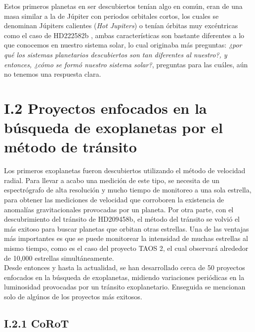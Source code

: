 Estos primeros planetas en ser descubiertos tenían algo en común, eran de una masa similar a la de Júpiter con periodos orbitales cortos, los cuales se denominan Júpiters calientes (\textit{Hot Jupiters}) o tenían órbitas muy excéntricas como el caso de HD222582b \cite{vogt2000six}, ambas características son bastante diferentes a lo que conocemos en nuestro sistema solar, lo cual originaba más preguntas: \textit{¿por qué los sistemas planetarios descubiertos son tan diferentes al nuestro?, y entonces, ¿cómo se formó nuestro sistema solar?}, preguntas para las cuáles, aún no tenemos una respuesta clara.\\ 

\section*{I.2 Proyectos enfocados en la búsqueda de exoplanetas por el método de tránsito}

Los primeros exoplanetas fueron descubiertos utilizando el método de velocidad radial. Para llevar a acabo una medición de este tipo, se necesita de un espectrógrafo de alta resolución y mucho tiempo de monitoreo a una sola estrella, para obtener las mediciones de velocidad que corroboren la existencia de anomalías gravitacionales provocadas por un planeta. Por otra parte, con el descubrimiento del tránsito de HD209458b, el método del tránsito se volvió el más exitoso para buscar planetas que orbitan otras estrellas. Una de las ventajas más importantes es que se puede monitorear la intensidad de muchas estrellas al mismo tiempo, como es el caso del proyecto TAOS 2, el cual observará alrededor de 10,000 estrellas simultáneamente.\\

Desde entonces y hasta la actualidad, se han desarrollado cerca de 50 proyectos enfocados en la búsqueda de exoplanetas, midiendo variaciones periódicas en la luminosidad provocadas por un tránsito exoplanetario. Enseguida se mencionan solo de algúnos de los proyectos más exitosos.\\



\subsection*{I.2.1 CoRoT}

